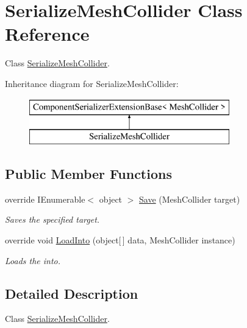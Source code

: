 \hypertarget{class_serialize_mesh_collider}{}\section{Serialize\+Mesh\+Collider Class Reference}
\label{class_serialize_mesh_collider}


Class \hyperlink{class_serialize_mesh_collider}{Serialize\+Mesh\+Collider}.  


Inheritance diagram for Serialize\+Mesh\+Collider\+:\begin{figure}[H]
\begin{center}
\leavevmode
\includegraphics[height=2.000000cm]{class_serialize_mesh_collider}
\end{center}
\end{figure}
\subsection*{Public Member Functions}
\begin{DoxyCompactItemize}
\item 
override I\+Enumerable$<$ object $>$ \hyperlink{class_serialize_mesh_collider_acbc1ced332f6d66efa97213718c8e90a}{Save} (Mesh\+Collider target)
\begin{DoxyCompactList}\small\item\em Saves the specified target. \end{DoxyCompactList}\item 
override void \hyperlink{class_serialize_mesh_collider_a1eccb54d758de6fa752f5b0b564fb5bd}{Load\+Into} (object\mbox{[}$\,$\mbox{]} data, Mesh\+Collider instance)
\begin{DoxyCompactList}\small\item\em Loads the into. \end{DoxyCompactList}\end{DoxyCompactItemize}


\subsection{Detailed Description}
Class \hyperlink{class_serialize_mesh_collider}{Serialize\+Mesh\+Collider}. 



